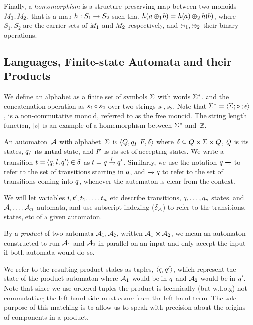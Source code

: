\documentclass[acmsmall,review,anonymous,screen]{acmart}\settopmatter{printfolios=true,printccs=true,printacmref=true}
\theoremstyle{definition}
\begin{document}
Finally, a \textit{homomorphism} is a structure-preserving map between two monoids
$M_1, M_2$, that is a map $h : S_1 \rightarrow S_2$ such that $h(a
\operatorname{\oplus}_1 b) = h(a) \operatorname{\oplus}_2 h(b)$, where $S_1, S_2$ are the carrier
sets of $M_1$ and $M_2$ respectively, and $\operatorname{\oplus}_1, \operatorname{\oplus}_2$
their binary operations.

\subsection{Languages, Finite-state Automata and their Products}

We define an alphabet as a finite set of symbols $\Sigma$ with words $\Sigma^*$, and
the concatenation operation as $s_1 \operatorname{\circ}{} s_2$ over two strings $s_1, s_2$.
Note that $\Sigma^* = \left\langle\Sigma;\operatorname{\circ}{};\epsilon\right\rangle$, is a
non-commutative monoid, referred to as the free monoid. The string length
function, $|s|$ is an example of a homomorphism between $\Sigma^*$
and~$\mathbb{Z}$.

An automaton~$\mathcal{A}$ with alphabet~$\Sigma$ is
$\left\langle Q, q_I, F, \delta\right\rangle$ where $\delta \subseteq Q \times \Sigma \times
Q$, $Q$ is its states, $q_I$ its
initial state, and $F$ is its set of accepting states.  We
write a transition $t = \left\langle q, l, q'\right\rangle \in
\delta$ as $t = q \xrightarrow{l} q'$.
Similarly, we use the notation $q \xrightarrow{}$ to refer to the set of
transitions starting in $q$, and $\xrightarrow{} q$ to refer to the
set of transitions coming into $q$, whenever the automaton is clear from
the context.

We will let variables $t, t', t_1, \ldots,
t_n$ etc describe transitions, $q, \ldots, q_n$ states, and
$\mathcal{A}, \ldots, \mathcal{A}_n$ automata, and use subscript indexing
($\delta_{\mathcal{A}}$) to refer to the transitions, states, etc of a given
automaton.

By a \emph{product} of two automata $\mathcal{A}_1, \mathcal{A}_2$, written
$\mathcal{A}_1 \times \mathcal{A}_2$, we mean an automaton constructed to run
$\mathcal{A}_1$ and $\mathcal{A}_2$ in parallel on an input and only accept the
input if both automata would do so.

We refer to the resulting product states as tuples, $\left\langle q, q'\right\rangle$,
which represent the state of the product automaton where $\mathcal{A}_1$ would be
in $q$ and $\mathcal{A}_2$ would be in $q'$. Note that since we use
ordered tuples the product is technically (but w.l.o.g) not commutative; the
left-hand-side must come from the left-hand term. The sole purpose of this
matching is to allow us to speak with precision about the origins of components
in a product.
\end{document}
